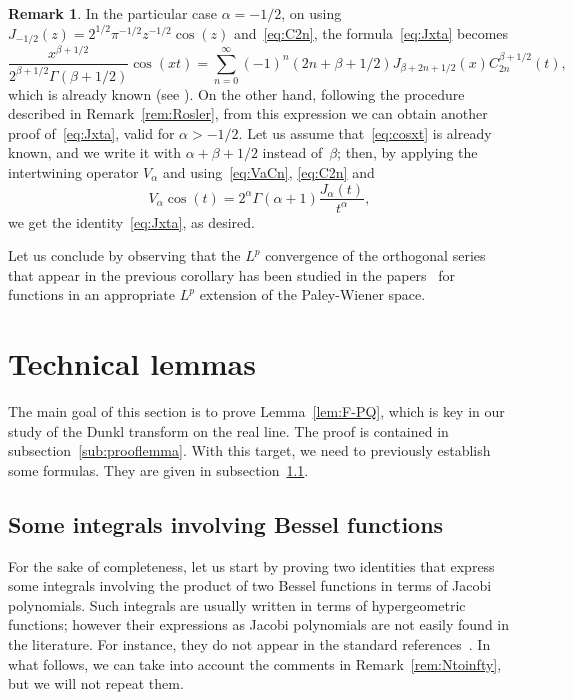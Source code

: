 \documentclass[11pt,a4paper]{amsart}
\theoremstyle{plain}
\theoremstyle{definition}
\newtheorem{Rem}{Remark}
\begin{document}
\begin{Rem}
\label{rem:referee}
In the particular case $\alpha=-1/2$, on using 
$J_{-1/2}(z) = 2^{1/2} \pi^{-1/2} z^{-1/2} \cos(z)$ 
and~\eqref{eq:C2n}, the formula~\eqref{eq:Jxta} becomes
\begin{equation}
\label{eq:cosxt}
  \frac{x^{\beta+1/2}}{2^{\beta+1/2}\Gamma(\beta+1/2)} \cos(xt) 
  = \sum_{n = 0}^{\infty} (-1)^n (2n+\beta+1/2) J_{\beta+2n+1/2}(x)
  C_{2n}^{\beta+1/2}(t),
\end{equation}
which is already known (see \cite[\S\,11.5, formula~(5), p.~369]{Wat}). 
On the other hand, following the procedure described in Remark~\ref{rem:Rosler}, 
from this expression we can obtain another proof of~\eqref{eq:Jxta}, 
valid for $\alpha > -1/2$. Let us assume that~\eqref{eq:cosxt} is already known,
and we write it with $\alpha+\beta+1/2$ instead of~$\beta$;
then, by applying the intertwining operator $V_\alpha$ and using~\eqref{eq:VaCn}, 
\eqref{eq:C2n} and
\begin{equation*}
  V_\alpha \cos(t) = 2^\alpha \Gamma(\alpha+1) \frac{J_\alpha(t)}{t^\alpha},
\end{equation*}
we get the identity~\eqref{eq:Jxta}, as desired.
\end{Rem}

Let us conclude by observing that the $L^p$ convergence of the
orthogonal series that appear in the previous corollary has been
studied in the papers~\cite{V, CGPV} for functions in an appropriate
$L^p$ extension of the Paley-Wiener space.

\section{Technical lemmas}

The main goal of this section is to prove Lemma~\ref{lem:F-PQ},
which is key in our study of the Dunkl
transform on the real line. The proof is contained in 
subsection~\ref{sub:prooflemma}. With this target, we need 
to previously establish some formulas. They are given in 
subsection~\ref{sub:intBessel}.

\subsection{Some integrals involving Bessel functions}
\label{sub:intBessel}

For the sake of completeness, let us start by proving two identities
that express some integrals involving the product of two Bessel
functions in terms of Jacobi polynomials. Such integrals
are usually written in terms of hypergeometric functions; 
however their expressions as Jacobi polynomials are not
easily found in the literature. For instance, they do not appear
in the standard references~\cite{E-HTF-II, Wat, E-TIT-II}.
In what follows, we can take into account the comments in 
Remark~\ref{rem:Ntoinfty}, but we will not repeat them.
\end{document}
